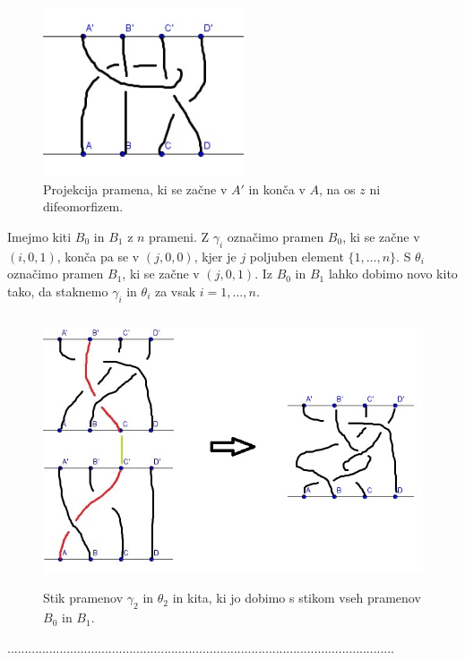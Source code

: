 \documentclass[mat1]{fmfdelo}
\begin{document}
\begin{figure}[h!]
\includegraphics[height = 5cm]{ne-kita}
\caption{Projekcija pramena, ki se začne v $A'$ in konča v $A$, na os $z$ ni difeomorfizem.}
\end{figure}


Imejmo kiti $B_0$ in $B_1$ z $n$ prameni. Z $\gamma_i$ označimo pramen $B_0$, ki se začne v $(i, 0, 1)$, konča pa se v $(j, 0, 0)$, kjer je $j$ poljuben element $\{1, \ldots, n\}$. S $\theta_i$ označimo pramen $B_1$, ki se začne v $(j, 0, 1)$. Iz $B_0$ in $B_1$ lahko dobimo novo kito tako, da staknemo $\gamma_i$ in $\theta_i$ za vsak $i=1, \ldots, n$.

\begin{figure}[h!]
\includegraphics[height = 8cm]{Stikanje_2}
\caption{Stik pramenov $\gamma_2$ in $\theta_2$ in kita, ki jo dobimo s stikom vseh pramenov $B_0$ in $B_1$.}
\end{figure}

...............................................................................................................\\
\end{document}
